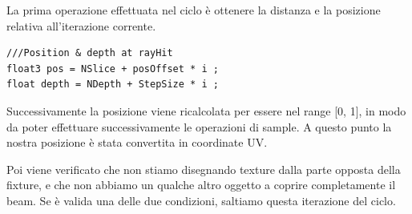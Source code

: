 \documentclass[main.tex]{subfiles}
\begin{document}
La prima operazione effettuata nel ciclo è ottenere la distanza e la posizione relativa all'iterazione corrente.
\begin{lstlisting}
///Position & depth at rayHit
float3 pos = NSlice + posOffset * i ;
float depth = NDepth + StepSize * i ;
\end{lstlisting}
Successivamente la posizione viene ricalcolata per essere nel range [0, 1], in modo da poter effettuare successivamente le operazioni di sample. A questo punto la nostra posizione è stata convertita in coordinate UV.
%
%
\newline

\noindent Poi viene verificato che non stiamo disegnando texture dalla parte opposta della fixture, e che non abbiamo un qualche altro oggetto a coprire completamente il beam. Se è valida una delle due condizioni, saltiamo questa iterazione del ciclo.
%
\newline
\end{document}
